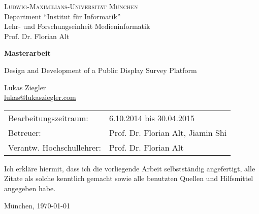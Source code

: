 \documentclass[11pt,a4paper,twoside]{article}
\begin{document}
\pagestyle{empty} %

\begin{center}
\textsc{Ludwig-Maximilians-Universit\"at M\"unchen}\\
Department ``Institut f\"ur Informatik''\\
Lehr- und Forschungseinheit Medieninformatik\\
Prof. Dr. Florian Alt

\vspace{5cm}
{\large\textbf{Masterarbeit}}\vspace{.5cm}

\vspace{2cm}
{\huge Design and Development of a Public Display Survey Platform}
\vspace{2cm}

{\large Lukas Ziegler}\\\href{mailto:lukas@lukasziegler.com}{lukas@lukasziegler.com}

\end{center}
\vfill

\begin{tabular}{ll}
Bearbeitungszeitraum: & 6.10.2014 bis 30.04.2015\\
Betreuer: & Prof. Dr. Florian Alt, Jiamin Shi\\
Verantw. Hochschullehrer: & Prof. Dr. Florian Alt
\end{tabular}

\clearpage

    

\clearpage

    


\vfill %

\noindent Ich erkl\"are hiermit, dass ich die vorliegende Arbeit
selbstst\"andig angefertigt, alle Zitate als solche kenntlich gemacht
sowie alle benutzten Quellen und Hilfsmittel angegeben habe.

\bigskip\noindent M\"unchen, \today

\vspace{4ex}\noindent\makebox[7cm]{\dotfill}



\clearpage

    
\end{document}
